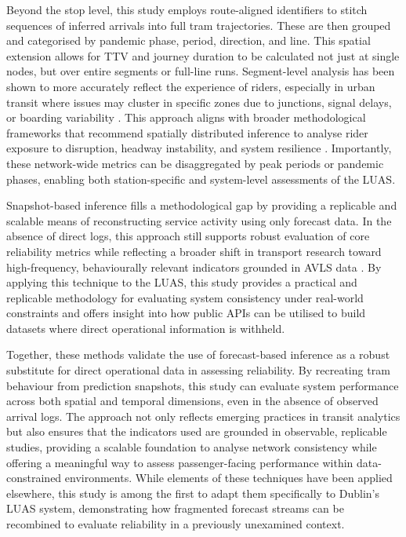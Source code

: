     Beyond the stop level, this study employs route-aligned identifiers to stitch sequences of inferred arrivals into full tram trajectories. These are then grouped and categorised by pandemic phase, period, direction, and line. This spatial extension allows for TTV and journey duration to be calculated not just at single nodes, but over entire segments or full-line runs. Segment-level analysis has been shown to more accurately reflect the experience of riders, especially in urban transit where issues may cluster in specific zones due to junctions, signal delays, or boarding variability \parencite{zuniga2021estimation}. This approach aligns with broader methodological frameworks that recommend spatially distributed inference to analyse rider exposure to disruption, headway instability, and system resilience \parencite{cats2016risk}. Importantly, these network-wide metrics can be disaggregated by peak periods or pandemic phases, enabling both station-specific and system-level assessments of the LUAS.

    Snapshot-based inference fills a methodological gap by providing a replicable and scalable means of reconstructing service activity using only forecast data. In the absence of direct logs, this approach still supports robust evaluation of core reliability metrics while reflecting a broader shift in transport research toward high-frequency, behaviourally relevant indicators grounded in AVLS data \parencite{tirachini2022headway}. By applying this technique to the LUAS, this study provides a practical and replicable methodology for evaluating system consistency under real-world constraints and offers insight into how public APIs can be utilised to build datasets where direct operational information is withheld.

    Together, these methods validate the use of forecast-based inference as a robust substitute for direct operational data in assessing reliability. By recreating tram behaviour from prediction snapshots, this study can evaluate system performance across both spatial and temporal dimensions, even in the absence of observed arrival logs. The approach not only reflects emerging practices in transit analytics but also ensures that the indicators used are grounded in observable, replicable studies, providing a scalable foundation to analyse network consistency while offering a meaningful way to assess passenger-facing performance within data-constrained environments. While elements of these techniques have been applied elsewhere, this study is among the first to adapt them specifically to Dublin’s LUAS system, demonstrating how fragmented forecast streams can be recombined to evaluate reliability in a previously unexamined context.



